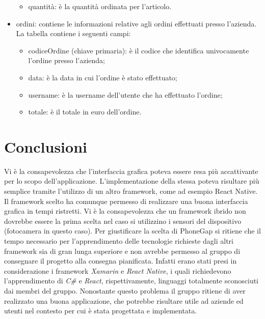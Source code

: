 \documentclass[12pt, a4paper, titlepage]{report}
\begin{document}
\begin{itemize}
\begin{itemize}
			\item quantità: è la quantità ordinata per l'articolo.
		\end{itemize}
		\item ordini: contiene le informazioni relative agli ordini effettuati presso l'azienda. La tabella contiene i seguenti campi:
		\begin{itemize}
			\item codiceOrdine (chiave primaria): è il codice che identifica univocamente l'ordine presso l'azienda;
			\item data: è la data in cui l'ordine è stato effettuato;
			\item username: è la username dell'utente che ha effettuato l'ordine;
			\item totale: è il totale in euro dell'ordine.
		\end{itemize}
	\end{itemize}
	
	\section{Conclusioni}
	Vi è la consapevolezza che l'interfaccia grafica poteva essere resa più accattivante per lo scopo dell'applicazione. L'implementazione della stessa poteva risultare più semplice tramite l'utilizzo di un altro framework, come ad esempio React Native. 
	Il framework scelto ha comunque permesso di realizzare una buona interfaccia grafica in tempi ristretti. Vi è la consapevolezza che un framework ibrido non dovrebbe essere la prima scelta nel caso si utilizzino i sensori del dispositivo (fotocamera in questo caso). Per giustificare la scelta di PhoneGap si ritiene che il tempo necessario per l'apprendimento delle tecnologie richieste dagli altri framework sia di gran lunga superiore e non avrebbe permesso al gruppo di consegnare il progetto alla consegna pianificata. Infatti erano stati presi in considerazione i framework \textit{Xamarin} e \textit{React Native}, i quali richiedevono l'apprendimento di \textit{C\#} e \textit{React}, rispettivamente, linguaggi totalmente sconosciuti dai membri del gruppo. Nonostante questo problema il gruppo ritiene di aver realizzato una buona applicazione, che potrebbe risultare utile ad aziende ed utenti nel contesto per cui è stata progettata e implementata.
\end{document}
